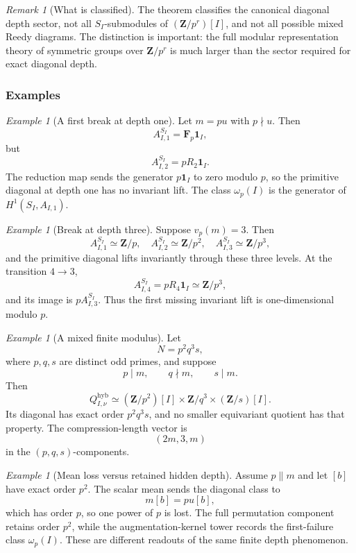 \documentclass[11pt]{article}
\theoremstyle{remark}
\newtheorem{remark}[theorem]{Remark}
\newtheorem{example}[theorem]{Example}
\newcommand{\Z}{\mathbf Z}
\newcommand{\F}{\mathbf F}
\begin{document}
\begin{remark}[What is classified]
The theorem classifies the canonical diagonal depth sector, not all \(S_I\)-submodules of \((\Z/p^r)[I]\), and not all possible mixed Reedy diagrams.  The distinction is important: the full modular representation theory of symmetric groups over \(\Z/p^r\) is much larger than the sector required for exact diagonal depth.
\end{remark}

\subsubsection{Examples}

\begin{example}[A first break at depth one]
Let \(m=p u\) with \(p\nmid u\).  Then
\[
 A_{I,1}^{S_I}=\F_p\mathbf1_I,
\]
but
\[
 A_{I,2}^{S_I}=pR_2\mathbf1_I.
\]
The reduction map sends the generator \(p\mathbf1_I\) to zero modulo \(p\), so the primitive diagonal at depth one has no invariant lift.  The class \(\omega_p(I)\) is the generator of \(H^1(S_I,A_{I,1})\).
\end{example}

\begin{example}[Break at depth three]
Suppose \(v_p(m)=3\).  Then
\[
 A_{I,1}^{S_I}\simeq\Z/p,
 \quad
 A_{I,2}^{S_I}\simeq\Z/p^2,
 \quad
 A_{I,3}^{S_I}\simeq\Z/p^3,
\]
and the primitive diagonal lifts invariantly through these three levels.  At the transition \(4\to3\),
\[
 A_{I,4}^{S_I}=pR_4\mathbf1_I\simeq\Z/p^3,
\]
and its image is \(pA_{I,3}^{S_I}\).  Thus the first missing invariant lift is one-dimensional modulo \(p\).
\end{example}

\begin{example}[A mixed finite modulus]
Let
\[
 N=p^2q^3s,
\]
where \(p,q,s\) are distinct odd primes, and suppose
\[
 p\mid m,
 \qquad
 q\nmid m,
 \qquad
 s\mid m.
\]
Then
\[
 Q_{I,\nu}^{\mathrm{hyb}}
 \simeq
 (\Z/p^2)[I]
 \times
 \Z/q^3
 \times
 (\Z/s)[I].
\]
Its diagonal has exact order \(p^2q^3s\), and no smaller equivariant quotient has that property.  The compression-length vector is
\[
 (2m,3,m)
\]
in the \((p,q,s)\)-components.
\end{example}

\begin{example}[Mean loss versus retained hidden depth]
Assume \(p\parallel m\) and let \([b]\) have exact order \(p^2\).  The scalar mean sends the diagonal class to
\[
 m[b]=pu[b],
\]
which has order \(p\), so one power of \(p\) is lost.  The full permutation component retains order \(p^2\), while the augmentation-kernel tower records the first-failure class \(\omega_p(I)\).  These are different readouts of the same finite depth phenomenon.
\end{example}
\end{document}
